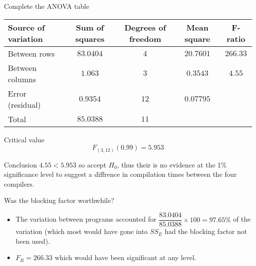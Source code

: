 \begin{example}
        \begin{step}{Complete the ANOVA table}
        \begin{center}
        \begin{tabular}{l|c|c|c|c}
        Source of variation & Sum of squares    & Degrees of freedom    & Mean square   & F-ratio       \\
        \hline
        Between rows        & $83.0404$         & $4$                   & $20.7601$     & $266.33$      \\
        Between columns     & $1.063$           & $3$                   & $0.3543$      & $4.55$        \\
        Error (residual)    & $0.9354$          & $12$                  & $0.07795$     &               \\
        \hline
        Total               & $85.0388$         & $11$                  &               &               \\
        \end{tabular}
        \end{center}
        \end{step}

        \begin{step}{Critical value}
        $$
        F_{(3, 12)}(0.99) = 5.953
        $$
        \end{step}

        \begin{step}{Conclusion}
        $4.55 < 5.953$ so accept $H_0$, thus their is no evidence at the 1\% significance level to suggest a diffrence in compilation times between the four compilers.
        \end{step}

        \begin{step}{Was the blocking factor worthwhile?}
        \begin{itemize}
        \item The variation between programs accounted for $\dfrac{83.0404}{85.0388} \times 100 = 97.65\%$ of the variation (which most would have gone into $SS_E$ had the blocking factor not been used).
        \item $F_R = 266.33$ which would have been significant at any level.
        \end{itemize}
        \end{step}

        \end{example}

    \newpage
